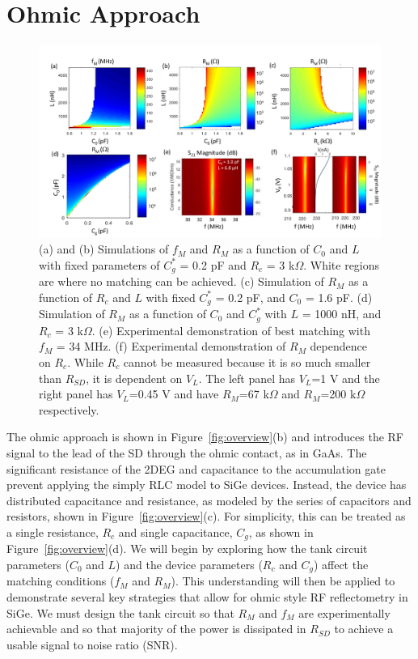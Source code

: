 \documentclass{article}
\begin{document}
\section{Ohmic Approach} %


\begin{figure}
	\includegraphics[width = \textwidth]{figures/HarvardFigure2_v7.pdf}		
	\caption{(a) and (b) Simulations of $f_M$ and $R_M$ as a function of $C_0$ and $L$ with fixed parameters of $C^*_g$ = 0.2 pF and $R_c$ = 3 k$\Omega$. White regions are where no matching can be achieved.  (c) Simulation of $R_M$ as a function of $R_c$ and $L$ with fixed $C^*_g$ = 0.2 pF, and $C_0$ = 1.6 pF. (d) Simulation of $R_M$ as a function of $C_0$ and $C^*_g$ with $L$ = 1000 nH, and $R_c$ = 3  k$\Omega$.  (e) Experimental demonstration of best matching with $f_M$ = 34 MHz.  (f) Experimental demonstration of $R_M$ dependence on $R_c$.  While $R_c$ cannot be measured because it is so much smaller than $R_{SD}$, it is dependent on $V_L$.  The left panel has $V_L$=1 V and the right panel has $V_L$=0.45 V and have $R_M$=67 k$\Omega$ and $R_M$=200 k$\Omega$ respectively.
	}
	\label{fig:Harvard}
\end{figure}



	\label{sub:ohmic_approach_circuit_and_model}
	
	The ohmic approach is shown in Figure\ \ref{fig:overview}(b) and introduces the RF signal to the lead of the SD through the ohmic contact, as in  GaAs.  The significant resistance of the 2DEG and capacitance to the accumulation gate prevent applying the simply RLC model to SiGe devices.  Instead, the device has distributed capacitance and resistance, as modeled by the series of capacitors and resistors, shown in Figure\ \ref{fig:overview}(c).  For simplicity, this can be treated as a single resistance, $R_c$ and single capacitance, $C_g$, as shown in Figure\ \ref{fig:overview}(d).  We will begin by exploring how the tank circuit parameters ($C_0$ and $L$) and the device parameters ($R_c$ and $C_g$) affect the matching conditions ($f_M$ and $R_M$).  This understanding will then be applied to demonstrate several key strategies that allow for ohmic style RF reflectometry in SiGe.  We must design the tank circuit so that $R_M$ and $f_M$ are experimentally achievable and so that majority of the power is dissipated in $R_{SD}$ to achieve a usable signal to noise ratio (SNR).
\end{document}
